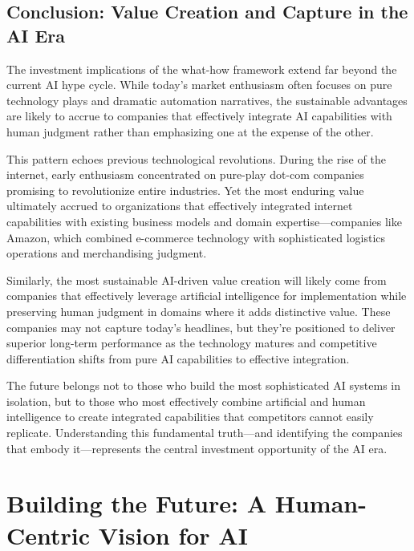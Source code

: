 \documentclass[
  Letterpaper,
]{scrbook}
\begin{document}
\section{Conclusion: Value Creation and Capture in the AI
Era}\label{conclusion-value-creation-and-capture-in-the-ai-era}

The investment implications of the what-how framework extend far beyond
the current AI hype cycle. While today's market enthusiasm often focuses
on pure technology plays and dramatic automation narratives, the
sustainable advantages are likely to accrue to companies that
effectively integrate AI capabilities with human judgment rather than
emphasizing one at the expense of the other.

This pattern echoes previous technological revolutions. During the rise
of the internet, early enthusiasm concentrated on pure-play dot-com
companies promising to revolutionize entire industries. Yet the most
enduring value ultimately accrued to organizations that effectively
integrated internet capabilities with existing business models and
domain expertise---companies like Amazon, which combined e-commerce
technology with sophisticated logistics operations and merchandising
judgment.

Similarly, the most sustainable AI-driven value creation will likely
come from companies that effectively leverage artificial intelligence
for implementation while preserving human judgment in domains where it
adds distinctive value. These companies may not capture today's
headlines, but they're positioned to deliver superior long-term
performance as the technology matures and competitive differentiation
shifts from pure AI capabilities to effective integration.

The future belongs not to those who build the most sophisticated AI
systems in isolation, but to those who most effectively combine
artificial and human intelligence to create integrated capabilities that
competitors cannot easily replicate. Understanding this fundamental
truth---and identifying the companies that embody it---represents the
central investment opportunity of the AI era.


\chapter{Building the Future: A Human-Centric Vision for
AI}\label{building-the-future-a-human-centric-vision-for-ai}
\end{document}
